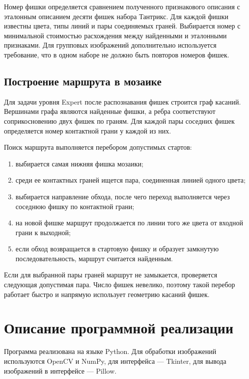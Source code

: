 \documentclass[12pt,a4paper]{article}
\begin{document}
Номер фишки определяется сравнением полученного признакового описания с эталонным описанием десяти фишек набора Тантрикс. Для каждой фишки известны цвета, типы линий и пары соединяемых граней. Выбирается номер с минимальной стоимостью расхождения между найденными и эталонными признаками. Для групповых изображений дополнительно используется требование, что в одном наборе не должно быть повторов номеров фишек.

\subsection{Построение маршрута в мозаике}
Для задачи уровня Expert после распознавания фишек строится граф касаний. Вершинами графа являются найденные фишки, а ребра соответствуют соприкосновению двух фишек по граням. Для каждой пары соседних фишек определяется номер контактной грани у каждой из них.

Поиск маршрута выполняется перебором допустимых стартов:
\begin{enumerate}[leftmargin=1.2cm]
    \item выбирается самая нижняя фишка мозаики;
    \item среди ее контактных граней ищется пара, соединенная линией одного цвета;
    \item выбирается направление обхода, после чего переход выполняется через соседнюю фишку по контактной грани;
    \item на новой фишке маршрут продолжается по линии того же цвета от входной грани к выходной;
    \item если обход возвращается в стартовую фишку и образует замкнутую последовательность, маршрут считается найденным.
\end{enumerate}

Если для выбранной пары граней маршрут не замыкается, проверяется следующая допустимая пара. Число фишек невелико, поэтому такой перебор работает быстро и напрямую использует геометрию касаний фишек.

\section{Описание программной реализации}
Программа реализована на языке Python. Для обработки изображений используются OpenCV и NumPy, для интерфейса --- Tkinter, для вывода изображений в интерфейсе --- Pillow.
\end{document}
